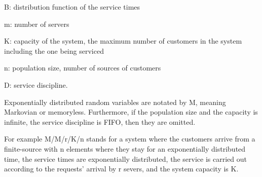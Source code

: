 B: distribution function of the service times

m: number of servers

K: capacity of the system, the maximum number of customers in the system including the one being serviced

n: population size, number of sources of customers

D: service discipline.

Exponentially distributed random variables are notated by M, meaning Markovian or memoryless.
Furthermore, if the population size and the capacity is infinite, the service discipline is FIFO, then they are omitted.

For example M/M/r/K/n stands for a system where the customers arrive from a finite-source with n elements where they stay for an exponentially distributed time, the service times are exponentially distributed, the service is carried out according to the requests’ arrival by r severs, and the system capacity is K.

